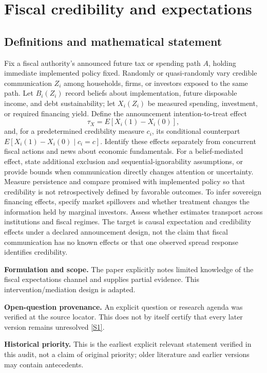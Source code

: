 \documentclass[11pt]{article}
\newcommand{\sref}[2]{\hyperlink{source:#1:#2}{[S#2]}}
\begin{document}
\section*{Fiscal credibility and expectations}\label{30007541}
\subsection{Definitions and mathematical statement}
Fix a fiscal authority’s announced future tax or spending path \(A\), holding immediate implemented policy fixed. Randomly or quasi-randomly vary credible communication \(Z_i\) among households, firms, or investors exposed to the same path. Let \(B_i(Z_i)\) record beliefs about implementation, future disposable income, and debt sustainability; let \(X_i(Z_i)\) be measured spending, investment, or required financing yield. Define the announcement intention-to-treat effect
\[
\tau_X=E[X_i(1)-X_i(0)],
\]
and, for a predetermined credibility measure \(c_i\), its conditional counterpart \(E[X_i(1)-X_i(0)\mid c_i=c]\).
Identify these effects separately from concurrent fiscal actions and news about economic fundamentals. For a belief-mediated effect, state additional exclusion and sequential-ignorability assumptions, or provide bounds when communication directly changes attention or uncertainty. Measure persistence and compare promised with implemented policy so that credibility is not retrospectively defined by favorable outcomes. To infer sovereign financing effects, specify market spillovers and whether treatment changes the information held by marginal investors. Assess whether estimates transport across institutions and fiscal regimes. The target is causal expectation and credibility effects under a declared announcement design, not the claim that fiscal communication has no known effects or that one observed spread response identifies credibility.

\par\textbf{Formulation and scope.} The paper explicitly notes limited knowledge of the fiscal expectations channel and supplies partial evidence. This intervention/mediation design is adapted.

\par\textbf{Open-question provenance.} An explicit question or research agenda was verified at the source locator. This does not by itself certify that every later version remains unresolved \sref{30007541}{1}.

\par\textbf{Historical priority.} This is the earliest explicit relevant statement verified in this audit, not a claim of original priority; older literature and earlier versions may contain antecedents.
\end{document}
